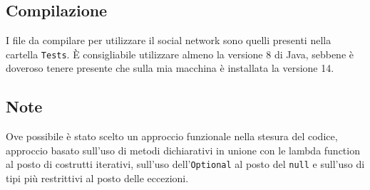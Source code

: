 \documentclass[a4paper,10pt]{book}
\begin{document}
\subsection*{Compilazione}

I file da compilare per utilizzare il social network sono quelli presenti nella cartella \texttt{Tests}. È consigliabile utilizzare almeno la versione 8 di Java,
sebbene è doveroso tenere presente che sulla mia macchina è installata la versione 14.

\subsection*{Note}
Ove possibile è stato scelto un approccio funzionale nella stesura del codice, approccio basato sull'uso di metodi dichiarativi in unione con le lambda function
al posto di costrutti iterativi, sull'uso dell'\texttt{Optional} al posto del \texttt{null} e sull'uso di tipi più restrittivi al posto delle eccezioni.
\end{document}
